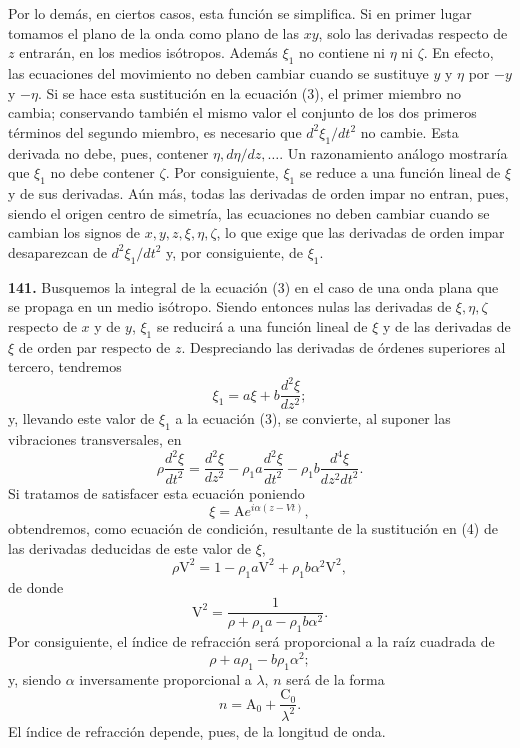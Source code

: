Por lo demás, en ciertos casos, esta función se
simplifica. Si en primer lugar tomamos el plano de la onda como plano de
las $xy$, solo las derivadas respecto de $z$ entrarán, en los medios
isótropos. Además $\xi_1$ no contiene ni $\eta$ ni $\zeta$. En efecto, las
ecuaciones del movimiento no deben cambiar cuando se sustituye $y$ y
$\eta$ por $-y$ y $-\eta$. Si se hace esta sustitución en la ecuación (3),
el primer miembro no cambia; conservando también el mismo valor el
conjunto de los dos primeros términos del segundo miembro, es necesario
que $d^2\xi_1/dt^2$ no cambie. Esta derivada no debe, pues, contener
$\eta,d\eta/dz,\ldots$. Un razonamiento análogo mostraría que $\xi_1$ no
debe contener $\zeta$. Por consiguiente, $\xi_1$ se reduce a una función
lineal de $\xi$ y de sus derivadas. Aún más, todas las derivadas de orden
impar no entran, pues, siendo el origen centro de simetría, las ecuaciones
no deben cambiar cuando se cambian los signos de $x,y,z,\xi,\eta,\zeta$, lo
que exige que las derivadas de orden impar desaparezcan de $d^2\xi_1/dt^2$
y, por consiguiente, de $\xi_1$.

\noindent\textbf{141.} Busquemos la integral de la ecuación (3) en el caso
de una onda plana que se propaga en un medio isótropo. Siendo entonces
nulas las derivadas de $\xi,\eta,\zeta$ respecto de $x$ y de $y$, $\xi_1$
se reducirá a una función lineal de $\xi$ y de las derivadas de $\xi$ de
orden par respecto de $z$. Despreciando las derivadas de órdenes
superiores al tercero, tendremos
\[
\xi_1=a\xi+b\frac{d^2\xi}{dz^2};
\]
y, llevando este valor de $\xi_1$ a la ecuación (3), se convierte, al
suponer las vibraciones transversales, en
\begin{equation}
\rho\frac{d^2\xi}{dt^2}=\frac{d^2\xi}{dz^2}-\rho_1a\frac{d^2\xi}{dt^2}
-\rho_1b\frac{d^4\xi}{dz^2dt^2}.
\tag{4}
\end{equation}
Si tratamos de satisfacer esta ecuación poniendo
\[
\xi=\mathrm Ae^{i\alpha(z-Vt)},
\]
obtendremos, como ecuación de condición, resultante de la sustitución en
(4) de las derivadas deducidas de este valor de $\xi$,
\[
\rho\mathrm V^2=1-\rho_1a\mathrm V^2+\rho_1b\alpha^2\mathrm V^2,
\]
de donde
\[
\mathrm V^2=\frac{1}{\rho+\rho_1a-\rho_1b\alpha^2}.
\]
Por consiguiente, el índice de refracción será proporcional a la raíz
cuadrada de
\[
\rho+a\rho_1-b\rho_1\alpha^2;
\]
y, siendo $\alpha$ inversamente proporcional a $\lambda$, $n$ será de la
forma
\[
n=\mathrm A_0+\frac{\mathrm C_0}{\lambda^2}.
\]
El índice de refracción depende, pues, de la longitud de onda.

